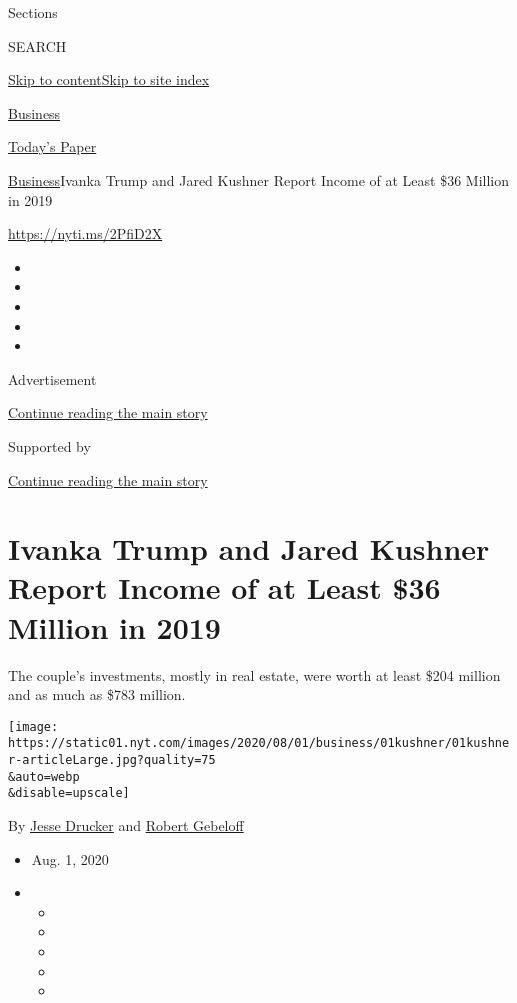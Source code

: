 Sections

SEARCH

\protect\hyperlink{site-content}{Skip to
content}\protect\hyperlink{site-index}{Skip to site index}

\href{https://www.nytimes.com/section/business}{Business}

\href{https://myaccount.nytimes.com/auth/login?response_type=cookie\&client_id=vi}{}

\href{https://www.nytimes.com/section/todayspaper}{Today's Paper}

\href{/section/business}{Business}\textbar{}Ivanka Trump and Jared
Kushner Report Income of at Least \$36 Million in 2019

\url{https://nyti.ms/2PfiD2X}

\begin{itemize}
\item
\item
\item
\item
\item
\end{itemize}

Advertisement

\protect\hyperlink{after-top}{Continue reading the main story}

Supported by

\protect\hyperlink{after-sponsor}{Continue reading the main story}

\hypertarget{ivanka-trump-and-jared-kushner-report-income-of-at-least-36-million-in-2019}{%
\section{Ivanka Trump and Jared Kushner Report Income of at Least \$36
Million in
2019}\label{ivanka-trump-and-jared-kushner-report-income-of-at-least-36-million-in-2019}}

The couple's investments, mostly in real estate, were worth at least
\$204 million and as much as \$783 million.

\texttt{[image: https://static01.nyt.com/images/2020/08/01/business/01kushner/01kushner-articleLarge.jpg?quality=75\\\&auto=webp\\\&disable=upscale]}

By \href{https://www.nytimes.com/by/jesse-drucker}{Jesse Drucker} and
\href{https://www.nytimes.com/by/robert-gebeloff}{Robert Gebeloff}

\begin{itemize}
\item
  Aug. 1, 2020
\item
  \begin{itemize}
  \item
  \item
  \item
  \item
  \item
  \end{itemize}
\end{itemize}

